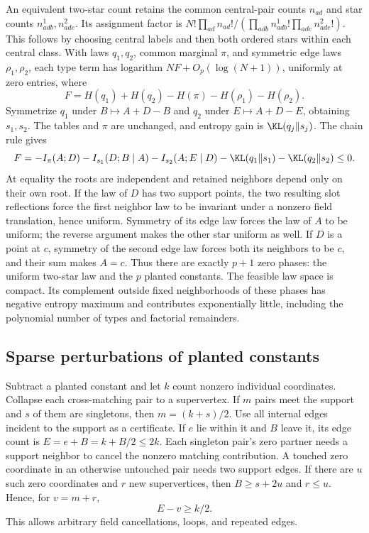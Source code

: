 An equivalent two-star count retains the common central-pair counts
$n_{ad}$ and star counts $n^1_{adb},n^2_{ade}$. Its assignment
factor is
$N!\prod_{ad}n_{ad}!/(\prod_{adb}n^1_{adb}!\prod_{ade}n^2_{ade}!)$.
This follows by choosing central labels and then both ordered stars
within each central class. With laws $q_1,q_2$, common marginal
$\pi$, and symmetric edge laws $\rho_1,\rho_2$, each type term has
logarithm $NF+O_p(\log(N+1))$, uniformly at zero entries, where
\[
 F=H(q_1)+H(q_2)-H(\pi)-H(\rho_1)-H(\rho_2).
\]
Symmetrize $q_1$ under $B\mapsto A+D-B$ and $q_2$ under
$E\mapsto A+D-E$, obtaining $s_1,s_2$. The tables and $\pi$ are
unchanged, and entropy gain is $\KL(q_j\Vert s_j)$. The chain rule gives
\begin{equation}\label{eq:cubic-zero-identity}
 F=-I_\pi(A;D)-I_{s_1}(D;B\mid A)-I_{s_2}(A;E\mid D)
                -\KL(q_1\Vert s_1)-\KL(q_2\Vert s_2)\le0.
\end{equation}
At equality the roots are independent and retained neighbors depend
only on their own root. If the law of $D$ has two support points,
the two resulting slot reflections force the first neighbor law
to be invariant under a nonzero field translation, hence uniform.
Symmetry of its edge law forces the law of $A$ to be uniform; the
reverse argument makes the other star uniform as well.
If $D$ is a point at $c$, symmetry of the second edge law forces
both its neighbors to be $c$, and their sum makes $A=c$.
Thus there are exactly $p+1$ zero phases: the uniform two-star law
and the $p$ planted constants. The feasible law space is compact.
Its complement outside fixed neighborhoods of these phases has
negative entropy maximum and contributes exponentially little,
including the polynomial number of types and factorial remainders.

\subsection{Sparse perturbations of planted constants}
Subtract a planted constant and let $k$ count nonzero individual
coordinates. Collapse each cross-matching pair to a supervertex.
If $m$ pairs meet the support and $s$ of them are singletons, then
$m=(k+s)/2$. Use all internal edges incident to the support as a
certificate. If $e$ lie within it and $B$ leave it, its edge count
is $E=e+B=k+B/2\le2k$.
Each singleton pair's zero partner needs a support neighbor to cancel
the nonzero matching contribution. A touched zero coordinate in an
otherwise untouched pair needs two support edges. If there are $u$
such zero coordinates and $r$ new supervertices, then
$B\ge s+2u$ and $r\le u$. Hence, for $v=m+r$,
\begin{equation}\label{eq:cubic-sparse-excess}
 E-v\ge k/2.
\end{equation}
This allows arbitrary field cancellations, loops, and repeated edges.


